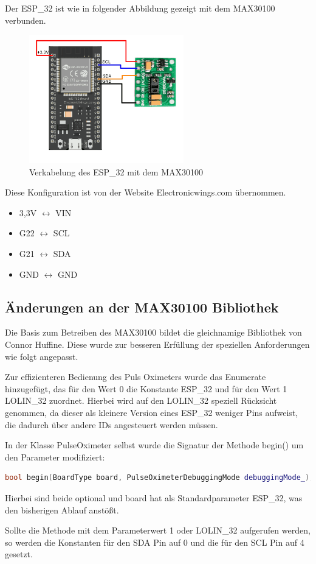 \documentclass[12pt,oneside]{article}
\newcommand{\quoteM}[1]{\glqq {#1}\grqq{} }
\begin{document}
  Der ESP\_32\cite{esp32} ist wie in folgender Abbildung gezeigt mit dem MAX30100\cite{max30100breakout} verbunden. 
  \begin{figure}[tph!]
  	\begin{center}
  		\includegraphics[width=0.6\textwidth]{MAX30100 Interfacing ESP32}
  	\caption{Verkabelung des ESP\_32 mit dem MAX30100\cite{max30100tutorial}}
  	\label{fig:espSchaltung}
  	\end{center}
  \end{figure}
Diese Konfiguration ist von der Website Electronicwings.com übernommen.
  \begin{itemize}
  	\item 3,3V $\longleftrightarrow$ VIN
  	\item G22 $\longleftrightarrow$ SCL
  	\item G21 $\longleftrightarrow$ SDA
  	\item GND $\longleftrightarrow$ GND
  \end{itemize}
  
  
  \subsection{Änderungen an der MAX30100 Bibliothek}
  Die Basis zum Betreiben des MAX30100 bildet die gleichnamige Bibliothek\cite{max30100bib} von Connor Huffine. Diese wurde zur besseren Erfüllung der speziellen Anforderungen wie folgt angepasst.\par
  Zur effizienteren Bedienung des Puls Oximeters wurde das Enumerate \quoteM{BoardType} hinzugefügt, das für den Wert 0 die Konstante ESP\_32 und für den Wert 1 LOLIN\_32 zuordnet. Hierbei wird auf den LOLIN\_32\cite{lolin32} speziell Rücksicht genommen, da dieser als kleinere Version eines ESP\_32 weniger Pins aufweist, die dadurch über andere IDs angesteuert werden müssen.\par 
  In der Klasse PulseOximeter selbst wurde die Signatur der Methode begin() um den Parameter \quoteM{board} modifiziert:
  \begin{lstlisting}[language=C++, caption={Signatur der begin() Methode}, captionpos=b]
bool begin(BoardType board, PulseOximeterDebuggingMode debuggingMode_);
  \end{lstlisting}
  Hierbei sind beide optional und board hat als Standardparameter ESP\_32, was den bisherigen Ablauf anstö\ss t.\par
  Sollte die Methode mit dem Parameterwert 1 oder LOLIN\_32 aufgerufen werden, so werden die Konstanten für den SDA Pin auf 0 und die für den SCL Pin auf 4 gesetzt.
\end{document}
